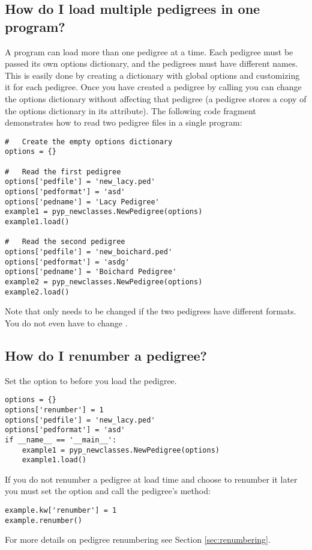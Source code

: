 \subsection{How do I load multiple pedigrees in one program?}
\label{sec:howto-load-multiple-pedigrees}
A \PyPedal{} program can load more than one pedigree at a time.  Each pedigree must be passed its own options dictionary, and the pedigrees must have different names.  This is easily done by creating a dictionary with global options and customizing it for each pedigree.  Once you have created a pedigree by calling  you can change the options dictionary without affecting that pedigree (a pedigree stores a copy of the options dictionary in its  attribute).  The following code fragment demonstrates how to read two pedigree files in a single program:
\begin{verbatim}
#   Create the empty options dictionary
options = {}

#   Read the first pedigree
options['pedfile'] = 'new_lacy.ped'
options['pedformat'] = 'asd'
options['pedname'] = 'Lacy Pedigree'
example1 = pyp_newclasses.NewPedigree(options)
example1.load()

#   Read the second pedigree
options['pedfile'] = 'new_boichard.ped'
options['pedformat'] = 'asdg'
options['pedname'] = 'Boichard Pedigree'
example2 = pyp_newclasses.NewPedigree(options)
example2.load()
\end{verbatim}
Note that  only needs to be changed if the two pedigrees have different formats.  You do not even have to change .
\subsection{How do I renumber a pedigree?}
\label{sec:howto-renumber-pedigree}
Set the  option to  before you load the pedigree.
\begin{verbatim}
options = {}
options['renumber'] = 1
options['pedfile'] = 'new_lacy.ped'
options['pedformat'] = 'asd'
if __name__ == '__main__':
    example1 = pyp_newclasses.NewPedigree(options)
    example1.load()
\end{verbatim}
If you do not renumber a pedigree at load time and choose to renumber it later you must set the  option and call the pedigree's  method:
\begin{verbatim}
example.kw['renumber'] = 1
example.renumber()
\end{verbatim}
For more details on pedigree renumbering see Section \ref{sec:renumbering}.

